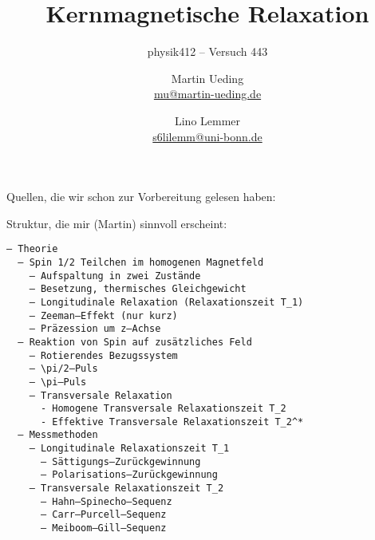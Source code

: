 


\usepackage{keystroke}
\usepackage{placeins}
\usepackage{pdflscape}
\usepackage{booktabs}
\usepackage{minted}
\usepackage{multicol}

\newcommand\versuchsnummer{443}

\ihead{physik412 – Versuch \versuchsnummer}

\subject{Praktikumsprotokoll}
\title{Kernmagnetische Relaxation}
\subtitle{physik412 – Versuch \versuchsnummer}
\author{
    Martin Ueding \\
    \small{\href{mailto:mu@martin-ueding.de}{mu@martin-ueding.de}}
    \and
    Lino Lemmer \\
    \small{\href{mailto:s6lilemm@uni-bonn.de}{s6lilemm@uni-bonn.de}}
}



\maketitle

\begin{abstract}
\end{abstract}

\tableofcontents

Quellen, die wir schon zur Vorbereitung gelesen haben:

\cite{teach_spin_manual}

\cite[Abschnitt~15.9.3]{meschede-gerthsen_24}

\cite{physik412-Anleitung}

Struktur, die mir (Martin) sinnvoll erscheint:

\begin{verbatim}
– Theorie
  – Spin 1/2 Teilchen im homogenen Magnetfeld
    – Aufspaltung in zwei Zustände
    – Besetzung, thermisches Gleichgewicht
    – Longitudinale Relaxation (Relaxationszeit T_1)
    – Zeeman–Effekt (nur kurz)
    – Präzession um z–Achse
  – Reaktion von Spin auf zusätzliches Feld
    – Rotierendes Bezugssystem
    – \pi/2–Puls
    – \pi–Puls
    – Transversale Relaxation
      - Homogene Transversale Relaxationszeit T_2
      - Effektive Transversale Relaxationszeit T_2^*
  – Messmethoden
    – Longitudinale Relaxationszeit T_1
      – Sättigungs–Zurückgewinnung
      – Polarisations–Zurückgewinnung
    – Transversale Relaxationszeit T_2
      – Hahn–Spinecho–Sequenz
      – Carr–Purcell–Sequenz
      – Meiboom–Gill–Sequenz
\end{verbatim}

